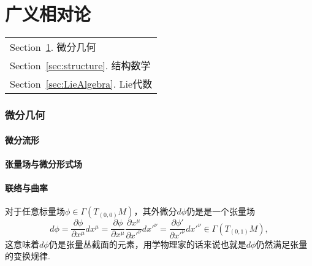 \part{广义相对论}\label{Part:GR}
	\begin{margintable}\vspace{1.4in}\footnotesize
		\begin{tabularx}{\marginparwidth}{|X}
		Section~\ref{sec:DG}. 微分几何\\
		Section~\ref{sec:structure}. 结构数学\\
		Section~\ref{sec:LieAlgebra}. Lie代数\\
		\end{tabularx}
	\end{margintable}
	\section{微分几何}\label{sec:DG}
		
	\subsection{微分流形}\label{sec:manifold}
	
	
	\subsection{张量场与微分形式场}
	
	
	\subsection{联络与曲率}
		对于任意标量场$\phi\in \varGamma(T_{(0,0)}M)$，其外微分$d\phi$仍是是一个张量场
		\begin{equation}
				 d\phi=\frac{\partial\phi}{\partial x^\mu}dx^\mu=\frac{\partial\phi}{\partial {x}^\mu}\frac{\partial{x}^\mu}{\partial {x'}^\nu}d{x'}^\nu=\frac{\partial{\phi'}}{\partial {x'}^\nu}d{x'}^\nu\in \varGamma(T_{(0,1)}M),
		\end{equation}
		这意味着$d\phi$仍是张量丛截面的元素，用学物理家的话来说也就是$d\phi$仍然满足张量的变换规律.
		
